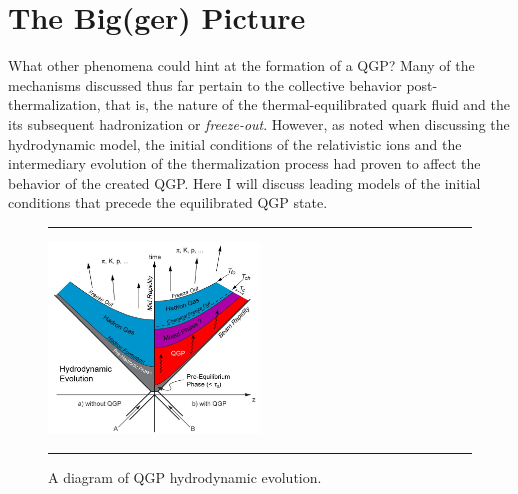 \section{The Big(ger) Picture}
What other phenomena could hint at the formation of a QGP? Many of the mechanisms discussed thus far pertain to the collective behavior post-thermalization, that is, the nature of the thermal-equilibrated quark fluid and the its subsequent hadronization or \textit{freeze-out}. However, as noted when discussing the hydrodynamic model, the initial conditions of the relativistic ions and the intermediary evolution of the thermalization process had proven to affect the behavior of the created QGP. Here I will discuss leading models of the initial conditions that precede the equilibrated QGP state.

\begin{figure}[b!]
  \centering
    \rule{35em}{0.5pt}
    \includegraphics[width=0.5\textwidth]{Figures/hydrodynamicevolution.JPG}

  \caption[A diagram of QGP hydrodynamic evolution.]{A diagram of QGP hydrodynamic evolution.}
  \label{fig:hydroevolution}
    \rule{35em}{0.5pt}
\end{figure}

